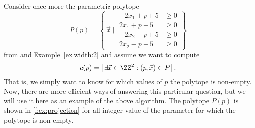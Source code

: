 \begin{example} \label{ex:projection}
Consider once more the parametric polytope
$$
P(p) = \left\{\,
\vec x \mid
\begin{aligned}
-2 x_1 + p + 5 &\ge 0 \\
2 x_1 + p + 5 &\ge 0 \\
-2 x_2 - p + 5 &\ge 0 \\
2 x_2 - p + 5 &\ge 0
\end{aligned}
\,\right\}
$$
from 
and Example~\ref{ex:width:2} and assume we want to
compute
$$
c(p) = \left[ \exists \vec x \in \ZZ^2: (p, \vec x) \in P \right]
.
$$
That is, we simply want to know for which values of $p$
the polytope is non-empty.
Now, there are more efficient ways of answering this particular question,
but we will use it here as an example of the above algorithm.
The polytope $P(p)$ is shown in \autoref{f:ex:projection} for
all integer value of the parameter for which the polytope
is non-empty.


\end{example}
